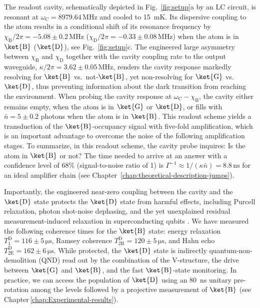 The readout cavity, schematically depicted in Fig.~\ref{fig:setup}a
by an LC circuit, is resonant at $\omega_{\mathrm{C}}=8979.64\,\mathrm{MHz}$
and cooled to 15~mK. Its dispersive coupling to the atom results
in a conditional shift of its resonance frequency by $\chi_{\mathrm{B}}/2\pi=-5.08\pm0.2\,\mathrm{MHz}$
($\chi_{\mathrm{D}}/2\pi=-0.33\pm0.08\,\mathrm{MHz}$) when the atom
is in $\ket{\mathrm{B}}$ ($\ket{\mathrm{D}}$), see Fig.~\ref{fig:setup}c.
The engineered large asymmetry between $\chi_{\mathrm{B}}$ and $\chi_{\mathrm{D}}$
together with the cavity coupling rate to the output waveguide, $\kappa/2\pi=3.62\pm0.05\,\mathrm{MHz}$,
renders the cavity response markedly resolving for $\ket{\mathrm{B}}$
vs.~not-$\ket{\mathrm{B}}$, yet non-resolving \citep{Gambetta2011-Purcell,Riste2013,Roch2014}
for $\ket{\mathrm{G}}$ vs.~$\ket{\mathrm{D}}$, thus preventing
information about the dark transition from reaching the environment.
When probing the cavity response at $\omega_{\mathrm{C}}-\chi_{\mathrm{B}}$,
the cavity either remains empty, when the atom is in $\ket{\mathrm{G}}$
or $\ket{\mathrm{D}}$, or fills with $\bar{n}=5\pm0.2$ photons when
the atom is in $\ket{\mathrm{B}}$. This readout scheme yields a transduction
of the $\ket{\mathrm{B}}$-occupancy signal with five-fold amplification,
which is an important advantage to overcome the noise of the following
amplification stages. To summarize, in this readout scheme, the cavity
probe inquires: Is the atom in $\ket{\mathrm{B}}$ or not? The time
needed to arrive at an answer with a confidence level of 68\% (signal-to-noise
ratio of 1) is $\Gamma^{-1}\approx1/\left(\kappa\bar{n}\right)=8.8\,\mathrm{ns}$
for an ideal amplifier chain (see Chapter~\ref{chap:theoretical-description-jumps}).

Importantly, the engineered near-zero coupling between the cavity
and the $\ket{\mathrm{D}}$ state protects the $\ket{\mathrm{D}}$
state from harmful effects, including Purcell relaxation, photon shot-noise
dephasing, and the yet unexplained residual measurement-induced relaxation
in superconducting qubits \citep{Slichter2016-T1vsNbar}. We have
measured the following coherence times for the $\ket{\mathrm{B}}$
state: energy relaxation $T_{1}^{\mathrm{D}}=116\pm5\,\mathrm{\mu s}$,
Ramsey coherence $T_{\mathrm{2R}}^{\mathrm{D}}=120\pm5\,\mathrm{\mu s}$,
and Hahn echo $T_{\mathrm{2E}}^{\mathrm{D}}=162\pm6\,\mathrm{\mu s}$.
While protected, the $\ket{\mathrm{D}}$ state is indirectly quantum-non-demolition
(QND) read out by the combination of the V-structure, the drive between
$\ket{\mathrm{G}}$ and $\ket{\mathrm{B}}$, and the fast $\ket{\mathrm{B}}$-state
monitoring. In practice, we can access the population of $\ket{\mathrm{D}}$
using an 80~ns unitary pre-rotation among the levels followed by
a projective measurement of $\ket{\mathrm{B}}$ (see Chapter\,\ref{chap:Experimental-results}). 

